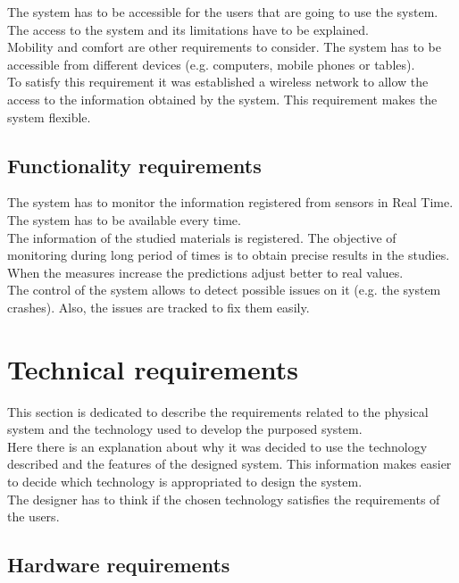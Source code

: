 The system has to be accessible for the users that are going to use the system. The access to the system and its limitations have to be explained.\\

Mobility and comfort are other requirements to consider. The system has to be accessible from different devices (e.g. computers, mobile phones or tables).\\

To satisfy this requirement it was established a wireless network to allow the access to the information obtained by the system. This requirement makes the system flexible.

\subsection{Functionality requirements}

The system has to monitor the information registered from sensors in Real Time. The system has to be available every time.\\

The information of the studied materials is registered. The objective of monitoring during long period of times is to obtain precise results in the studies. When the measures increase the predictions adjust better to real values.\\

The control of the system allows to detect possible issues on it (e.g. the system crashes). Also, the issues are tracked to fix them easily.

\section{Technical requirements}

This section is dedicated to describe the requirements related to the physical system and the technology used to develop the purposed system.\\

Here there is an explanation about why it was decided to use the technology described and the features of the designed system. This information makes easier to decide which technology is appropriated to design the system.\\

The designer has to think if the chosen technology satisfies the requirements of the users.


\subsection{Hardware requirements}

